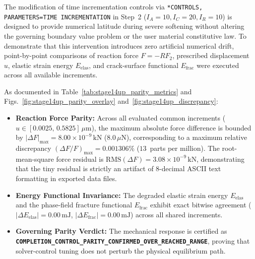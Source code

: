 The modification of time incrementation controls via \texttt{*CONTROLS, PARAMETERS=TIME INCREMENTATION} in Step~2 ($I_A = 10, I_C = 20, I_R = 10$) is designed to provide numerical latitude during severe softening without altering the governing boundary value problem or the user material constitutive law. To demonstrate that this intervention introduces zero artificial numerical drift, point-by-point comparisons of reaction force $F = -RF_2$, prescribed displacement $u$, elastic strain energy $E_{\mathrm{elas}}$, and crack-surface functional $E_{\mathrm{frac}}$ were executed across all available increments.

As documented in Table~\ref{tab:stage14up_parity_metrics} and Figs.~\ref{fig:stage14up_parity_overlay} and~\ref{fig:stage14up_discrepancy}:
\begin{itemize}
    \item \textbf{Reaction Force Parity:} Across all evaluated common increments ($u \in [0.0025, \, 0.5825]\,\mu\mathrm{m}$), the maximum absolute force difference is bounded by $|\Delta F|_{\max} = 8.00\times 10^{-9}\,\mathrm{kN}$ ($8.0\,\mu\mathrm{N}$), corresponding to a maximum relative discrepancy $(\Delta F / F)_{\max} = 0.001306\%$ ($13$~parts per million). The root-mean-square force residual is $\mathrm{RMS}(\Delta F) = 3.08\times 10^{-9}\,\mathrm{kN}$, demonstrating that the tiny residual is strictly an artifact of 8-decimal ASCII text formatting in exported data files.
    \item \textbf{Energy Functional Invariance:} The degraded elastic strain energy $E_{\mathrm{elas}}$ and the phase-field fracture functional $E_{\mathrm{frac}}$ exhibit exact bitwise agreement ($|\Delta E_{\mathrm{elas}}| = 0.00\,\mathrm{mJ}$, $|\Delta E_{\mathrm{frac}}| = 0.00\,\mathrm{mJ}$) across all shared increments.
    \item \textbf{Governing Parity Verdict:} The mechanical response is certified as \textbf{\texttt{COMPLETION\_CONTROL\_PARITY\_CONFIRMED\_OVER\_REACHED\_RANGE}}, proving that solver-control tuning does not perturb the physical equilibrium path.
\end{itemize}

